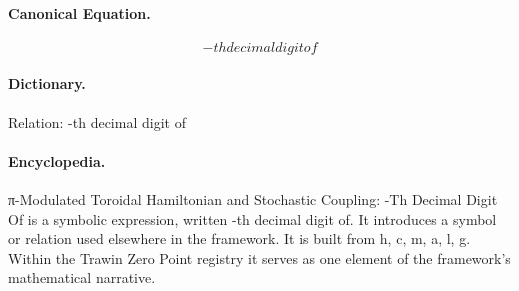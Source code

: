 \paragraph{Canonical Equation.}
\[
-th decimal digit of
\]

\paragraph{Dictionary.}
Relation: -th decimal digit of

\paragraph{Encyclopedia.}
π-Modulated Toroidal Hamiltonian and Stochastic Coupling: -Th Decimal Digit Of is a symbolic expression, written -th decimal digit of. It introduces a symbol or relation used elsewhere in the framework. It is built from h, c, m, a, l, g. Within the Trawin Zero Point registry it serves as one element of the framework's mathematical narrative.
